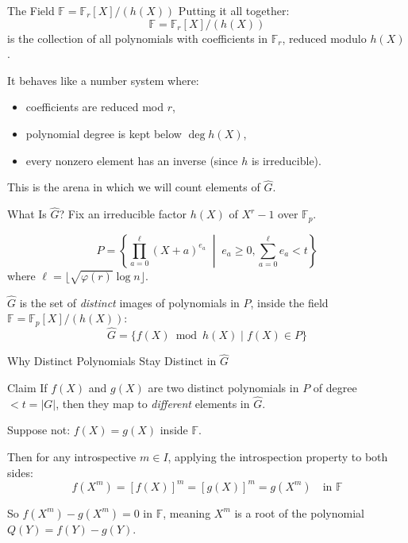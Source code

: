 \documentclass{beamer}
\begin{document}
\begin{frame}{The Field $\mathbb{F} = \mathbb{F}_r[X]/(h(X))$}
Putting it all together:
\[
    \mathbb{F} = \mathbb{F}_r[X] / (h(X))
\]
is the collection of all polynomials with coefficients in $\mathbb{F}_r$,
reduced modulo $h(X)$.

It behaves like a number system where:
\begin{itemize}
    \item coefficients are reduced mod $r$,
    \item polynomial degree is kept below $\deg h(X)$,
    \item every nonzero element has an inverse (since $h$ is irreducible).
\end{itemize}

This is the arena in which we will count elements of $\hat{G}$.
\end{frame}

\begin{frame}{What Is $\hat{G}$?}
Fix an irreducible factor $h(X)$ of $X^r - 1$ over $\mathbb{F}_p$.

\[
    P = \left\{ \prod_{a=0}^{\ell} (X+a)^{e_a} \;\middle|\; e_a \ge 0 , \sum_{a=0}^{\ell}{e_a}<t \right\}
\]
where $\ell = \lfloor \sqrt{\varphi(r)} \log n \rfloor$.

$\hat{G}$ is the set of \emph{distinct} images of polynomials in $P$,
inside the field $\mathbb{F} = \mathbb{F}_p[X]/(h(X))$:
\[
    \hat{G} = \{ f(X) \bmod h(X) \mid f(X) \in P \}
\]
\end{frame}


\begin{frame}{Why Distinct Polynomials Stay Distinct in $\hat{G}$}
\begin{block}{Claim}
If $f(X)$ and $g(X)$ are two distinct polynomials in $P$
of degree $< t = |G|$, then they map to \emph{different} elements in $\hat{G}$.
\end{block}

Suppose not: $f(X) = g(X)$ inside $\mathbb{F}$.

Then for any introspective $m \in I$, applying the introspection property to both sides:
\[
    f(X^m) = [f(X)]^m = [g(X)]^m = g(X^m) \quad \text{in } \mathbb{F}
\]

So $f(X^m) - g(X^m) = 0$ in $\mathbb{F}$, meaning $X^m$ is a root of
the polynomial $Q(Y) = f(Y) - g(Y)$.
\end{frame}
\end{document}
